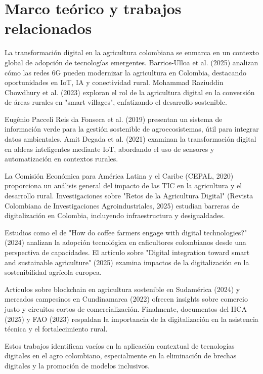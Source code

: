 \section{Marco teórico y trabajos relacionados}

La transformación digital en la agricultura colombiana se enmarca en un contexto global de adopción de tecnologías emergentes. Barrios-Ulloa et al. (2025) analizan cómo las redes 6G pueden modernizar la agricultura en Colombia, destacando oportunidades en IoT, IA y conectividad rural. Mohammad Raziuddin Chowdhury et al. (2023) exploran el rol de la agricultura digital en la conversión de áreas rurales en "smart villages", enfatizando el desarrollo sostenible.

Eugênio Pacceli Reis da Fonseca et al. (2019) presentan un sistema de información verde para la gestión sostenible de agroecosistemas, útil para integrar datos ambientales. Amit Degada et al. (2021) examinan la transformación digital en aldeas inteligentes mediante IoT, abordando el uso de sensores y automatización en contextos rurales.

La Comisión Económica para América Latina y el Caribe (CEPAL, 2020) proporciona un análisis general del impacto de las TIC en la agricultura y el desarrollo rural. Investigaciones sobre "Retos de la Agricultura Digital" (Revista Colombiana de Investigaciones Agroindustriales, 2025) estudian barreras de digitalización en Colombia, incluyendo infraestructura y desigualdades.

Estudios como el de "How do coffee farmers engage with digital technologies?" (2024) analizan la adopción tecnológica en caficultores colombianos desde una perspectiva de capacidades. El artículo sobre "Digital integration toward smart and sustainable agriculture" (2025) examina impactos de la digitalización en la sostenibilidad agrícola europea.

Artículos sobre blockchain en agricultura sostenible en Sudamérica (2024) y mercados campesinos en Cundinamarca (2022) ofrecen insights sobre comercio justo y circuitos cortos de comercialización. Finalmente, documentos del IICA (2025) y FAO (2023) respaldan la importancia de la digitalización en la asistencia técnica y el fortalecimiento rural.

Estos trabajos identifican vacíos en la aplicación contextual de tecnologías digitales en el agro colombiano, especialmente en la eliminación de brechas digitales y la promoción de modelos inclusivos.